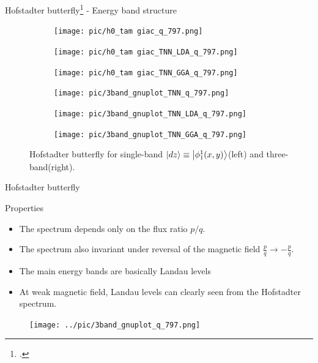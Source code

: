 \documentclass[aspectratio=169,compress,x11names]{beamer}
\begin{document}
	\begin{frame}{Hofstadter butterfly\footcite{PhysRevB.14.2239} - Energy band structure}
		\begin{figure}
			\centering
			\begin{subfigure}[b]{0.3\textwidth}
				\centering
				\texttt{[image: pic/h0\_tam giac\_q\_797.png]}
				\label{fig:3 band}
			\end{subfigure}
			\begin{subfigure}[b]{0.3\textwidth}
				\centering
				\texttt{[image: pic/h0\_tam giac\_TNN\_LDA\_q\_797.png]}
				\label{}
			\end{subfigure}
			\begin{subfigure}[b]{0.3\textwidth}
				\centering
				\texttt{[image: pic/h0\_tam giac\_TNN\_GGA\_q\_797.png]}
				\label{}
			\end{subfigure}
			\begin{subfigure}[b]{0.3\textwidth}
				\centering
				\texttt{[image: pic/3band\_gnuplot\_TNN\_q\_797.png]}
				\label{fig:1 band}
			\end{subfigure}
			\begin{subfigure}[b]{0.3\textwidth}
				\centering
				\texttt{[image: pic/3band\_gnuplot\_TNN\_LDA\_q\_797.png]}
				\label{}
			\end{subfigure}
			\begin{subfigure}[b]{0.3\textwidth}
				\centering
				\texttt{[image: pic/3band\_gnuplot\_TNN\_GGA\_q\_797.png]}
				\label{}
			\end{subfigure}
			\caption{
				Hofstadter butterfly for single-band $\ket{dz} \equiv \ket{\phi_{1}^{1}(x,y)}$(left) and three-band(right). 
			}
		\end{figure}
	\end{frame}
 	\begin{frame}{Hofstadter butterfly}
		\begin{multicols}{2}
			\begin{minipage}{\columnwidth}
				\begin{block}{Properties}
					\begin{itemize}
						\item The spectrum depends only on the flux ratio $p/q$.
						\item The spectrum also invariant under reversal of the magnetic field $\tfrac{p}{q} \to -\tfrac{p}{q}$.
						\item The main energy bands are basically Landau levels
						\item At weak magnetic field, Landau levels can clearly seen from the Hofstadter spectrum.
					\end{itemize}
				\end{block}
			\end{minipage}
			\begin{minipage}{\columnwidth}
				\begin{figure}
					\centering
					\texttt{[image: ../pic/3band\_gnuplot\_q\_797.png]}
				\end{figure}
			\end{minipage}
		\end{multicols}
	\end{frame}
\end{document}
